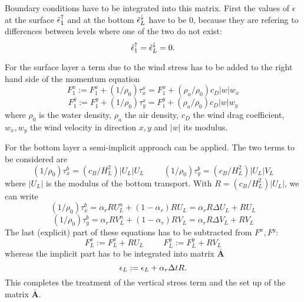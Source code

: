 \documentclass[12pt,draft]{article}
\newcommand{\Unew}{U^n}
\newcommand{\Vnew}{V^n}
\newcommand{\Uold}{U}
\newcommand{\Vold}{V}
\newcommand{\Udel}{\Delta U}
\newcommand{\Vdel}{\Delta V}
\newcommand{\Amat}{\mathbf{\bar{A}}}
\newcommand{\dt}{\Delta t}
\begin{document}
Boundary conditions have to be integrated into this matrix. First
the values of $\epsilon$  at the surface $\tilde{\epsilon}^\uparrow_1$ and at the 
bottom $\tilde{\epsilon}^\downarrow_L$ have to be 0, because they are refering
to differences between levels where one of the two do not
exist:
\begin{equation}
	\tilde{\epsilon}^\uparrow_1 = \tilde{\epsilon}^\downarrow_L = 0.
\end{equation}

For the surface layer a term due to the wind stress has to
be added to the right hand side of the momentum equation
\begin{equation}
	F^x_1 := F^x_1 + (1/\rho_0)\tau^s_x
	= F^x_1 + (\rho_a/\rho_0)c_D|w|w_x
\end{equation}
\begin{equation}
	F^y_1 := F^y_1 + (1/\rho_0)\tau^s_y
	= F^y_1 + (\rho_a/\rho_0)c_D|w|w_y
\end{equation}
where $\rho_0$ is the water density, $\rho_a$ the air density,
$c_D$ the wind drag coefficient, $w_x,w_y$ the wind velocity
in direction $x,y$ and $|w|$ its modulus.

For the bottom layer a semi-implicit approach can be applied. The two terms to be considered are 
\begin{equation}
	(1/\rho_0)\tau^b_x = (c_B/H_L^2)|U_L|U_L
	\hspace{1cm}
	(1/\rho_0)\tau^b_y = (c_B/H_L^2)|U_L|V_L
\end{equation}
where $|U_L|$ is the modulus of the bottom transport. With $R=(c_B/H_L^2)|U_L|$, we can write
\begin{equation}
	(1/\rho_0)\tau^b_x 
	= \alpha_r R\Unew_L + (1-\alpha_r)R\Uold_L
	= \alpha_r R\Udel_L + R\Uold_L
\end{equation}
\begin{equation}
	(1/\rho_0)\tau^b_y 
	= \alpha_r R\Vnew_L + (1-\alpha_r)R\Vold_L
	= \alpha_r R\Vdel_L + R\Vold_L
\end{equation}
The last (explicit) part of these equations has to be subtracted
from $F^x,F^y$:
\begin{equation}
		F^x_L := F^x_L + R\Uold_L
	\hspace{1cm}
		F^y_L := F^y_L + R\Vold_L
\end{equation}
whereas the implicit part has to be integrated into 
matrix $\Amat$
\begin{equation}
		\EC{L} := \EC{L} + \alpha_r\dt R.
\end{equation}
This completes the treatment of the vertical stress term
and the set up of the matrix $\Amat$.
\end{document}
